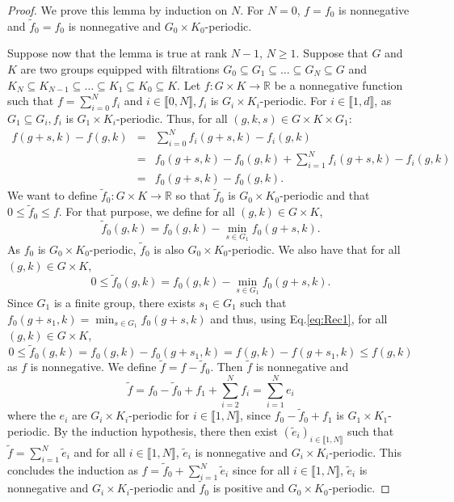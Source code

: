 \documentclass[a4paper, notitlepage, 11pt]{article}
\numberwithin{equation}{section}
\newcommand{\R}{\mathbb{R}}
\newcommand{\IntEnt}[2]{\llbracket #1 , #2 \rrbracket}
\begin{document}
\begin{proof}
    We prove this lemma by induction on $N$. 
    For $N=0$, $f=f_{0}$ is nonnegative and $\tilde{f}_{0}=f_{0}$ is nonnegative and $G_0\times K_0$-periodic.

    Suppose now that the lemma is true at rank $N-1$, $N\geq1$. Suppose that $G$ and $K$ are two groups equipped with filtrations $G_{0}\subseteq G_{1} \subseteq \dots \subseteq G_{N} \subseteq G$ and $K_{N}\subseteq K_{N-1} \subseteq \dots \subseteq K_{1} \subseteq K_{0} \subseteq K$. Let $f:G\times K \to \R$ be a nonnegative function such that $f = \sum_{i=0}^{N} f_{i}$ and $i\in\IntEnt{0}{N}, f_{i}$ is $G_{i}\times K_{i}$-periodic. For $i\in\IntEnt{1}{d}$,  as  $G_{1} \subseteq G_{i}, f_{i}$ is  $G_{1}\times K_{i}$-periodic. Thus, for all $(g,k,s) \in G\times K \times G_{1}$:
    \begin{equation}\label{eq:Rec1}
     \begin{array}{rcl}
          f(g+s,k) - f(g,k) &=&\displaystyle \sum_{i=0}^{N} f_{i}(g+s,k) - f_{i}(g,k) \\
          &=& \displaystyle f_{0}(g+s,k) - f_{0}(g,k) + \sum_{i=1}^{N} f_{i}(g+s,k) - f_{i}(g,k) \\
          &=& \displaystyle f_{0}(g+s,k) - f_{0}(g,k).
     \end{array}
    \end{equation}
    We want to define $\tilde{f}_{0}:G\times K \to \R $ so that $\tilde{f}_0$ is $G_0\times K_0$-periodic and that $0 \leqslant \tilde{f}_0 \leqslant f$. For that purpose, we define for all $(g,k)\in G\times K$,
    \[
    \tilde{f}_{0}(g,k) = f_{0}(g,k) - \min_{s\in G_{1}} f_{0}(g+s,k).
    \]
    As $f_0$ is $G_0\times K_0$-periodic, $\tilde{f}_{0}$ is also $G_0\times K_0$-periodic. We also have that for all $(g,k)\in G\times K$,
    \[
    0 \leqslant \tilde{f}_{0}(g,k) = f_{0}(g,k) - \min_{s\in G_{1}} f_{0}(g+s,k).
    \]
    Since $G_1$ is a finite group, there exists $s_1\in G_{1}$ such that $f_{0}(g+s_1,k) = \min_{s\in G_{1}} f_{0}(g+s,k)$ and thus, using Eq.\eqref{eq:Rec1}, for all $(g,k)\in G\times K$,
    \[
     0 \leqslant \tilde{f}_{0}(g,k) =  f_{0}(g,k) - f_{0}(g+s_{1},k) = f(g,k) - f(g+s_1,k) \leqslant f(g,k)  
    \]
    as $f$ is nonnegative.
    We define $\tilde{f} = f-\tilde{f}_{0}$. Then $\tilde{f}$ is nonnegative and 
    \begin{equation}\label{eq:tildef}
    \tilde{f} = f_0 - \tilde{f}_{0} + f_{1} + \sum_{i=2}^{N}f_{i}=\sum_{i=1}^N e_i
    \end{equation}
    where the $e_{i}$ are $G_{i}\times K_{i}$-periodic for $i\in\IntEnt{1}{N}$, since $f_0 - \tilde{f}_{0} + f_{1}$ is $G_{1}\times K_{1}$-periodic. 
    By the induction hypothesis, there then exist $(\tilde{e}_{i})_{i\in\IntEnt{1}{N}}$ such that $\tilde{f} = \sum_{i=1}^{N} \tilde{e}_{i}$ and for all $i\in\IntEnt{1}{N}$, $\tilde{e}_{i}$ is nonnegative and $G_{i}\times K_{i}$-periodic. This concludes the induction as $f = \tilde{f}_{0} + \sum_{i=1}^{N} \tilde{e}_{i}$ since for all $i\in\IntEnt{1}{N}$, $\tilde{e}_{i}$ is nonnegative and $G_{i}\times K_{i}$-periodic and $\tilde{f}_{0}$ is positive and $G_{0}\times K_{0}$-periodic.
\end{proof}
\end{document}
